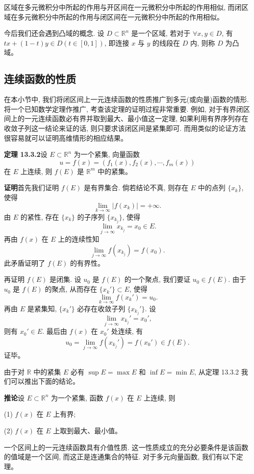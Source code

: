 \documentclass[UTF8, 12pt, fontset=fandol, oneside]{ctexart}
\begin{document}
区域在多元微积分中所起的作用与开区间在一元微积分中所起的作用相似, 而闭区域在多元微积分中所起的作用与闭区间在一元微积分中所起的作用相似。

今后我们还会遇到凸域的概念. 设 $D\subset\mathbb R^n$ 是一个区域, 若对于 $\forall x,y\in D$, 有 $tx+(1-t)y\in D(t\in[0,1])$, 即连接 $x$ 与 $y$ 的线段在 $D$ 内, 则称 $D$ 为凸域。

\subsection{连续函数的性质}

在本小节中, 我们将闭区间上一元连续函数的性质推广到多元(或向量)函数的情形. 将一个已知数学定理作推广, 考查该定理的证明过程非常重要. 例如, 对于有界闭区间上的一元连续函数必有界并取到最大、最小值这一定理, 如果利用有界序列存在收敛子列这一结论来证的话, 则只要求该闭区间是紧集即可. 而用类似的论证方法很容易就可以证明高维情形的相应结果。

\noindent\textbf{定理 13.3.2}\quad 设 $E\subset\mathbb R^n$ 为一个紧集, 向量函数
\[
  u=f(x)=(f_1(x),f_2(x),\cdots,f_m(x))
\]
在 $E$ 上连续, 则 $f(E)$ 是 $\mathbb R^m$ 中的紧集。

\noindent\textbf{证明}\quad 首先我们证明 $f(E)$ 是有界集合. 倘若结论不真, 则存在 $E$ 中的点列 $\{x_k\}$, 使得
\[
  \lim_{k\to\infty}|f(x_k)|=+\infty.
\]
由 $E$ 的紧性, 存在 $\{x_k\}$ 的子序列 $\{x_{k_j}\}$, 使得
\[
  \lim_{j\to\infty}x_{k_j}=x_0\in E.
\]
再由 $f(x)$ 在 $E$ 上的连续性知
\[
  \lim_{j\to\infty}f(x_{k_j})=f(x_0).
\]
此矛盾证明了 $f(E)$ 的有界性。

再证明 $f(E)$ 是闭集. 设 $u_0$ 是 $f(E)$ 的一个聚点, 我们要证 $u_0\in f(E)$. 由于 $u_0$ 是 $f(E)$ 的聚点, 从而存在 $\{x_k'\}\subset E$, 使得
\[
  \lim_{k\to\infty}f(x_k')=u_0.
\]
再由 $E$ 是紧集知, $\{x_k'\}$ 必存在收敛子列 $\{x_{k_j}'\}$. 设
\[
  \lim_{j\to\infty}x_{k_j}'=x_0',
\]
则有 $x_0'\in E$. 最后由 $f(x)$ 在 $x_0'$ 处连续, 有
\[
  u_0=\lim_{j\to\infty}f(x_{k_j}')=f(x_0')\in f(E).
\]
证毕。

由于对 $\mathbb R$ 中的紧集 $E$ 必有 $\sup E=\max E$ 和 $\inf E=\min E$, 从定理 13.3.2 我们可以推出下面的结论。

\noindent\textbf{推论}\quad 设 $E\subset\mathbb R^n$ 为一个紧集, 函数 $f(x)$ 在 $E$ 上连续, 则

(1) $f(x)$ 在 $E$ 上有界;

(2) $f(x)$ 在 $E$ 上取到最大、最小值。

一个区间上的一元连续函数具有介值性质. 这一性质成立的充分必要条件是该函数的值域是一个区间, 而这正是连通集合的特征. 对于多元向量函数, 我们有以下定理。
\end{document}
